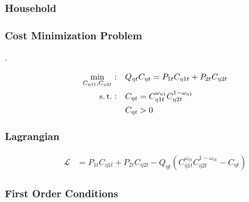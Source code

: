 \documentclass[../thesis.tex]{subfiles}
\begin{document}
\newpage




\subsubsection{Household}

\subsubsection*{Cost Minimization Problem}

\textcite[p.424]{walsh_monetary_2017}.

	\begin{align}
		\min_{C_{\eta 1 t}, C_{\eta 2 t}}: &\quad Q_{\eta t} C_{\eta t} = P_{1 t} C_{\eta 1t} + P_{2 t} C_{\eta 2t} \label{eq_v6:reg-consumption-cost}
		\\
		\operatorname{s.t.}: &\quad C_{\eta t} = C_{\eta 1 t}^{\omega_{\eta 1}} C_{\eta 2 t}^{1-\omega_{\eta 1}} \label{eq_v6:reg-consumption-aggregation} \\
		&\quad C_{\eta t} > 0 \nonumber
	\end{align}

\subsubsection*{Lagrangian}

	\begin{align}
		\mathcal{L} &= P_{1 t} C_{\eta 1t} + P_{2 t} C_{\eta 2t} - Q_{\eta t} (C_{\eta 1 t}^{\omega_{\eta 1}} C_{\eta 2 t}^{1-\omega_{\eta 1}} - C_{\eta t}) \label{eq_v6:reg-consumption-lagrangian}
	\end{align}

\subsubsection*{First Order Conditions}
\end{document}
